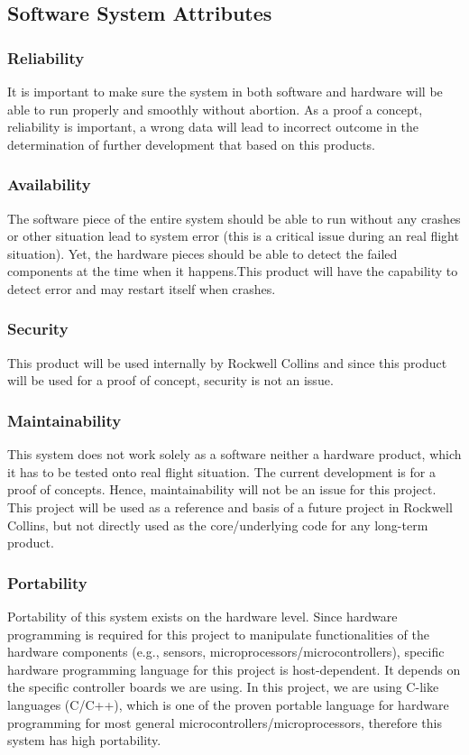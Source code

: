 \subsection{Software System Attributes}
\subsubsection{Reliability}
It is important to make sure the system in both software and hardware will be able to run properly and smoothly without abortion. As a proof a concept, reliability is important, a wrong data will lead to incorrect outcome in the determination of further development that based on this products.
\\
\subsubsection{Availability}
The software piece of the entire system should be able to run without any crashes or other situation lead to system error (this is a critical issue during an real flight situation). Yet, the hardware pieces should be able to detect the failed components at the time when it happens.This product will have the capability to detect error and may restart itself when crashes.
\\
\subsubsection{Security}
This product will be used internally by Rockwell Collins and since this product will be used for a proof of concept, security is not an issue.
\\
\subsubsection{Maintainability}
This system does not work solely as a software neither a hardware product, which it has to be tested onto real flight situation. The current development  is for a proof of concepts. Hence, maintainability will not be an issue for this project. This project will be used as a reference and basis of a future project in Rockwell Collins, but not directly used as the core/underlying code for any long-term product.
\\
\subsubsection{Portability}
Portability of this system exists on the hardware level. Since hardware programming is required for this project to manipulate functionalities of the hardware components (e.g., sensors, microprocessors/microcontrollers), specific hardware programming language for this project is host-dependent. It depends on the specific controller boards we are using. In this project, we are using C-like languages (C/C++), which is one of the proven portable language for hardware programming for most general microcontrollers/microprocessors, therefore this system has high portability.







